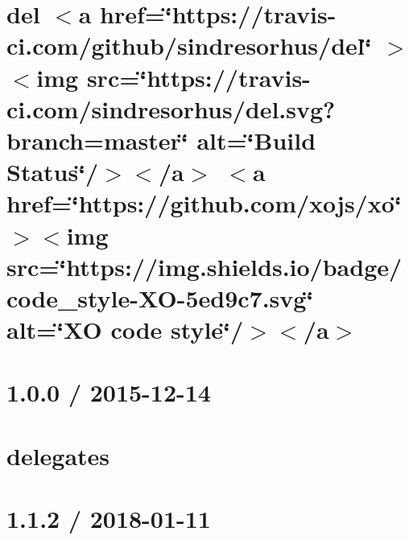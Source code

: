 \documentclass[twoside]{book}
\newcommand{\+}{\discretionary{\mbox{\scriptsize$\hookleftarrow$}}{}{}}
\begin{document}
\chapter{del \texorpdfstring{$<$}{<}a href=\char`\"{}https\+://travis-\/ci.\+com/github/sindresorhus/del\char`\"{} \texorpdfstring{$>$}{>}\texorpdfstring{$<$}{<}img src=\char`\"{}https\+://travis-\/ci.\+com/sindresorhus/del.\+svg?branch=master\char`\"{} alt=\char`\"{}\+Build Status\char`\"{}/\texorpdfstring{$>$}{>}\texorpdfstring{$<$}{<}/a\texorpdfstring{$>$}{>} \texorpdfstring{$<$}{<}a href=\char`\"{}https\+://github.\+com/xojs/xo\char`\"{} \texorpdfstring{$>$}{>}\texorpdfstring{$<$}{<}img src=\char`\"{}https\+://img.\+shields.\+io/badge/code\+\_\+style-\/\+XO-\/5ed9c7.\+svg\char`\"{} alt=\char`\"{}\+XO code style\char`\"{}/\texorpdfstring{$>$}{>}\texorpdfstring{$<$}{<}/a\texorpdfstring{$>$}{>}}
\label{md__c___users_vaishnavi_jadhav__desktop__developer_code_mean_stack_example_client_node_modules_del_readme}

\chapter{1.0.0 / 2015-\/12-\/14}
\label{md__c___users_vaishnavi_jadhav__desktop__developer_code_mean_stack_example_client_node_modules_delegates__history}

\chapter{delegates}
\label{md__c___users_vaishnavi_jadhav__desktop__developer_code_mean_stack_example_client_node_modules_delegates__readme}

\chapter{1.1.2 / 2018-\/01-\/11}
\label{md__c___users_vaishnavi_jadhav__desktop__developer_code_mean_stack_example_client_node_modules_depd__history}

\end{document}
